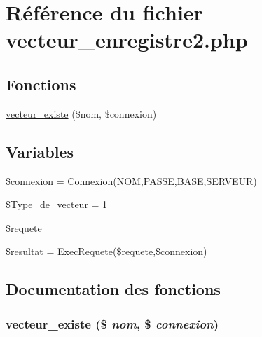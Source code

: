 \hypertarget{vecteur__enregistre2_8php}{
\section{R\'{e}f\'{e}rence du fichier vecteur\_\-enregistre2.php}
\label{vecteur__enregistre2_8php}
}
\subsection*{Fonctions}
\begin{CompactItemize}
\item 
\hyperlink{vecteur__enregistre2_8php_a4}{vecteur\_\-existe} (\$nom, \$connexion)
\end{CompactItemize}
\subsection*{Variables}
\begin{CompactItemize}
\item 
\hyperlink{vecteur__enregistre2_8php_a0}{\$connexion} = Connexion(\hyperlink{pma__connect_8php_a0}{NOM},\hyperlink{pma__connect_8php_a1}{PASSE},\hyperlink{pma__connect_8php_a3}{BASE},\hyperlink{pma__connect_8php_a2}{SERVEUR})
\item 
\hyperlink{vecteur__enregistre2_8php_a1}{\$Type\_\-de\_\-vecteur} = 1
\item 
\hyperlink{vecteur__enregistre2_8php_a2}{\$requete}
\item 
\hyperlink{vecteur__enregistre2_8php_a3}{\$resultat} = Exec\-Requete(\$requete,\$connexion)
\end{CompactItemize}


\subsection{Documentation des fonctions}
\hypertarget{vecteur__enregistre2_8php_a4}{
\subsubsection[vecteur\_\-existe]{\setlength{\rightskip}{0pt plus 5cm}vecteur\_\-existe (\$ {\em nom}, \$ {\em connexion})}}
\label{vecteur__enregistre2_8php_a4}




